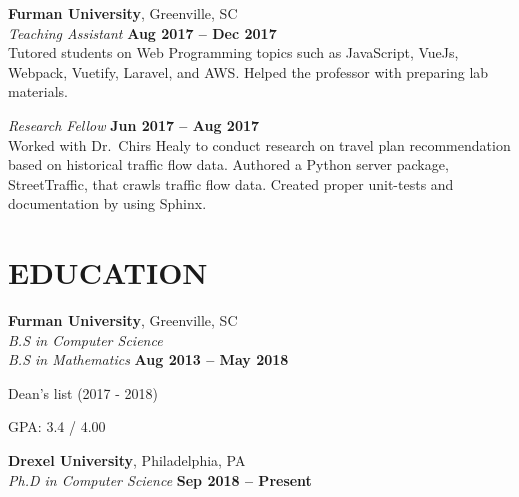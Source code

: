 \documentclass[margin,line]{resume}
\begin{document}
\begin{resume}
    \textbf{\listing Furman University}, Greenville, SC \vspace{2mm}\\\vspace{1mm}%
    \textsl{Teaching Assistant} \vspace{2mm}\hfill \textbf{Aug 2017 -- Dec 2017}\\
    Tutored students on Web Programming topics such as JavaScript, VueJs, Webpack, Vuetify, Laravel, and
    AWS. Helped the professor with preparing lab materials. \vspace{1mm}
    
    \textsl{Research Fellow} \vspace{2mm}\hfill \textbf{Jun 2017 -- Aug 2017}\\
    Worked with Dr.~Chirs Healy to conduct research on travel plan recommendation based on historical traffic flow data. Authored a Python server package, StreetTraffic, that crawls traffic flow data. Created proper unit-tests and documentation by using Sphinx.




\sectionline

    \section{\mysidestyle \textbf{\large{E}\small{DUCATION}}}

    \textbf{\listing Furman University}, Greenville, SC \vspace{2mm}\\\vspace{1mm}%
    \textsl{B.S in Computer Science \\ B.S in Mathematics} \hfill \vspace{0.1cm} \textbf{ Aug 2013 -- May 2018}\vspace{-3mm}\\\vspace{-1mm}%
    \begin{list2}
        \item Dean's list (2017 - 2018)
        \item GPA: 3.4 / 4.00
    \end{list2}
    
    \textbf{\listing Drexel University}, Philadelphia, PA \vspace{2mm}\\\vspace{1mm}%
    \textsl{Ph.D in Computer Science} \hfill \vspace{0.1cm} \textbf{ Sep 2018 -- Present}\vspace{-3mm}\\\vspace{-1mm}%





\end{resume}
\end{document}
